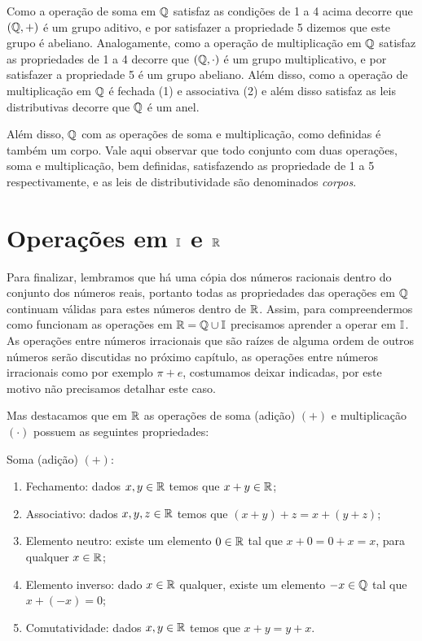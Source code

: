   Como a operação de soma em $\mathbb{Q}$ satisfaz as condições de 1 a 4 acima decorre que $(\mathbb{Q}, +)$ é um grupo aditivo, e por satisfazer a propriedade 5 dizemos que este grupo é abeliano. Analogamente, como a operação de multiplicação em $\mathbb{Q}$ satisfaz as propriedades de 1 a 4 decorre que $(\mathbb{Q}, \cdot)$ é um grupo multiplicativo, e por satisfazer a propriedade 5 é um grupo abeliano. Além disso, como a operação de multiplicação em $\mathbb{Q}$ é fechada (1) e associativa (2) e além disso satisfaz as leis distributivas decorre que $\mathbb{Q}$ é um anel.

  Além disso, $\mathbb{Q}$ com as operações de soma e multiplicação, como definidas é também um corpo. Vale aqui observar que todo conjunto com duas operações, soma e multiplicação, bem definidas, satisfazendo as propriedade de 1 a 5 respectivamente, e as leis de distributividade são denominados \emph{corpos}.

 \section{Operações em \texorpdfstring{$\mathbb{I}$}{I} e \texorpdfstring{$\mathbb{R}$}{R}}

 Para finalizar, lembramos que há uma cópia dos números racionais dentro do conjunto dos números reais, portanto todas as propriedades das operações em $\mathbb{Q}$ continuam válidas para estes números dentro de $\mathbb{R}$. Assim, para compreendermos como funcionam as operações em $\mathbb{R}= \mathbb{Q} \cup \mathbb{I}$ precisamos aprender a operar em $\mathbb{I}$. As operações entre números irracionais que são raízes de alguma ordem de outros números serão discutidas no próximo capítulo, as operações entre números irracionais como por exemplo $\pi + e$, costumamos deixar indicadas, por este motivo não precisamos detalhar este caso.

 Mas destacamos que em $\mathbb{R}$ as operações de soma (adição) $(+)$ e multiplicação $(\cdot)$ possuem as seguintes propriedades:

 Soma (adição) $(+)$:
 \begin{enumerate}[1)]
 \item Fechamento: dados $x, y \in \mathbb{R}$ temos que $x+y \in \mathbb{R}$;
 \item Associativo: dados $x, y, z \in \mathbb{R}$ temos que $(x+y)+z= x+(y+z)$;
 \item Elemento neutro: existe um elemento $0 \in \mathbb{R}$ tal que $x+0=0+x=x$, para qualquer $x \in \mathbb{R}$;
 \item Elemento inverso: dado $x \in \mathbb{R}$ qualquer, existe um elemento $-x \in \mathbb{Q}$ tal que $x+(-x)=0$;
 \item Comutatividade: dados $x, y \in \mathbb{R}$ temos que $x+y= y+x$.
 \end{enumerate}

